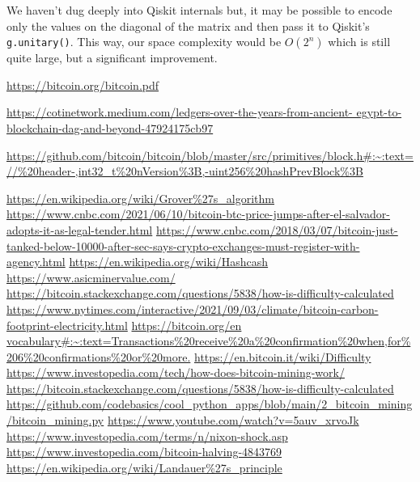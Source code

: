 \documentclass[11pt]{article} %
\begin{document}
\noindent We haven't dug deeply into Qiskit internals but, it may be possible to encode only the values on the diagonal of the matrix and then pass it to Qiskit's \lstinline{g.unitary()}. This way, our space complexity would be $O(2^n)$ which is still quite large, but a significant improvement.

\begin{thebibliography}{19}
\url{https://bitcoin.org/bitcoin.pdf}

 \url{https://cotinetwork.medium.com/ledgers-over-the-years-from-ancient-
egypt-to-blockchain-dag-and-beyond-47924175cb97}

 \url{https://github.com/bitcoin/bitcoin/blob/master/src/primitives/block.h#:~:text=//%20header-,int32_t%20nVersion%3B,-uint256%20hashPrevBlock%3B}

 \url{https://en.wikipedia.org/wiki/Grover%27s_algorithm}
  \url{https://www.cnbc.com/2021/06/10/bitcoin-btc-price-jumps-after-el-salvador-adopts-it-as-legal-tender.html}
 \url{https://www.cnbc.com/2018/03/07/bitcoin-just-tanked-below-10000-after-sec-says-crypto-exchanges-must-register-with-agency.html}
 \url{https://en.wikipedia.org/wiki/Hashcash}
 \url{https://www.asicminervalue.com/}
 \url{https://bitcoin.stackexchange.com/questions/5838/how-is-difficulty-calculated}
 \url{https://www.nytimes.com/interactive/2021/09/03/climate/bitcoin-carbon-footprint-electricity.html}
 \url{https://bitcoin.org/en vocabulary#:~:text=Transactions%20receive%20a%20confirmation%20when,for%206%20confirmations%20or%20more.}
 \url{https://en.bitcoin.it/wiki/Difficulty}
 \url{https://www.investopedia.com/tech/how-does-bitcoin-mining-work/}
 \url{https://bitcoin.stackexchange.com/questions/5838/how-is-difficulty-calculated}
 \url{https://github.com/codebasics/cool_python_apps/blob/main/2_bitcoin_mining/bitcoin_mining.py}
 \url{https://www.youtube.com/watch?v=5auv_xrvoJk}
 \url{https://www.investopedia.com/terms/n/nixon-shock.asp}
 \url{https://www.investopedia.com/bitcoin-halving-4843769}
 \url{https://en.wikipedia.org/wiki/Landauer%27s_principle}
\end{thebibliography}
\end{document}
